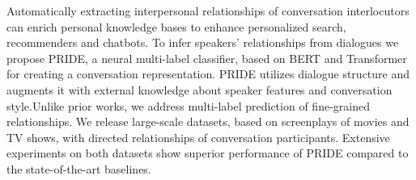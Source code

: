 {A}utomatically extracting interpersonal relationships of conversation interlocutors can enrich personal knowledge bases to enhance personalized search, recommenders and chatbots. {T}o infer speakers' relationships from dialogues we propose {PRIDE}, a neural multi-label classifier, based on {BERT} and {T}ransformer for creating a conversation representation. {PRIDE} utilizes dialogue structure and augments it with external knowledge about speaker features and conversation style.{U}nlike prior works, we address multi-label prediction of fine-grained relationships. {W}e release large-scale datasets, based on screenplays of movies and {TV} shows, with directed relationships of conversation participants. {E}xtensive experiments on both datasets show superior performance of {PRIDE} compared to the state-of-the-art baselines.
